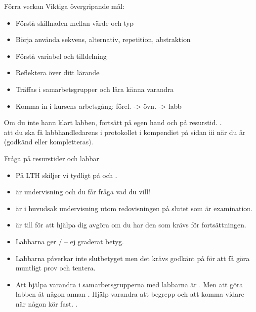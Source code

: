 

\begin{SlideExtra}{Förra veckan}
Viktiga övergripande mål:
\begin{itemize}
\item Förstå skillnaden mellan värde och typ
\item Börja använda sekvens, alternativ, repetition, abstraktion
\item Förstå variabel och tilldelning
\item Reflektera över ditt lärande
\item Träffas i samarbetsgrupper och lära känna varandra
\item Komma in i kursens arbetsgång: förel. -> övn. -> labb
\end{itemize}
Om du inte hann klart labben, fortsätt på egen hand och på resurstid. .
\\ 
 att du ska få labbhandledarens  i protokollet i kompendiet på sidan iii när du är  (godkänd eller kompletteras).
\end{SlideExtra}

\begin{SlideExtra}{Fråga på resurstider och labbar}
\begin{itemize}
  \item På LTH skiljer vi tydligt på  och .
  \item {} är undervisning och du får fråga vad du vill!
  \item {} är i huvudsak undervisning utom redovisningen på slutet som är examination. 
  \item {} är till för att hjälpa dig avgöra om du har den  som krävs för fortsättningen.
  \item Labbarna ger / -- ej graderat betyg. 
  \item Labbarna påverkar inte slutbetyget men det krävs godkänt på   för att få göra muntligt prov och tentera.
  \item Att hjälpa varandra i samarbetsgrupperna med labbarna är . Men att göra labben åt någon annan . Hjälp varandra att  begrepp och att komma vidare när någon kör fast. .
\end{itemize}  
\end{SlideExtra}



